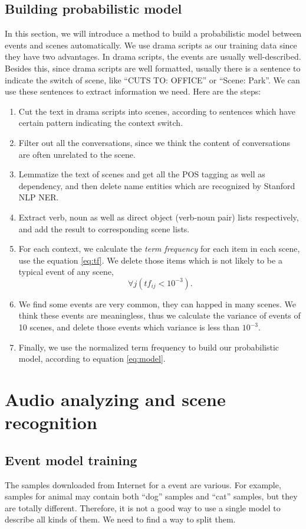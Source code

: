 \subsection{Building probabilistic model}
In this section, we will introduce a method to build a probabilistic model between events and scenes automatically. We use drama scripts as our training data since they have two advantages. In drama scripts, the events are usually well-described. Besides this, since drama scripts are well formatted, usually there is a sentence to indicate the switch of scene, like ``CUTS TO: OFFICE'' or ``Scene: Park''. We can use these sentences to extract information we need. Here are the steps:
\begin{enumerate}
\item Cut the text in drama scripts into scenes, according to sentences which have certain pattern indicating the context switch.
\item Filter out all the conversations, since we think the content of conversations are often unrelated to the scene.
\item Lemmatize the text of scenes and get all the POS tagging as well as dependency, and then delete name entities which are recognized by Stanford NLP NER.
\item Extract verb, noun as well as direct object (verb-noun pair) lists respectively, and add the result to corresponding scene lists.
\item For each context, we calculate the {\em term frequency} for each item in each scene, use the equation \ref{eq:tf}. We delete those items which is not likely to be a typical event of any scene, \ie
\begin{equation}
\forall j (tf_{ij} < 10^{-3}).
\end{equation}
\item We find some events are very common, they can happed in many scenes. We think these events are meaningless, thus we calculate the variance of events of 10 scenes, and delete those events which variance is less than $10^{-3}$.
\item Finally, we use the normalized term frequency to build our probabilistic model, according to equation \ref{eq:model}.
\end{enumerate}
\section{Audio analyzing and scene recognition}
\label{score}
\subsection{Event model training}
The samples downloaded from Internet for a event are various. For example, samples for animal may contain both ``dog'' samples and ``cat'' samples, but they are totally different. Therefore, it is not a good way to use a single model to describe all kinds of them. We need to find a way to split them.

